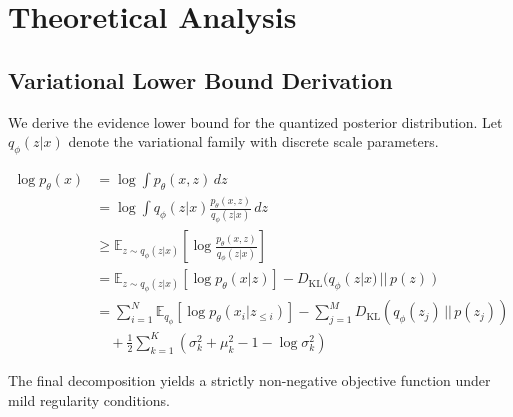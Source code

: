 \documentclass{article}
\newcommand{\E}{\mathbb{E}}
\newcommand{\KL}{D_{\text{KL}}}
\begin{document}
\section{Theoretical Analysis}
\label{sec:theory}

\subsection{Variational Lower Bound Derivation}
\label{subsec:variational_bound}
We derive the evidence lower bound for the quantized posterior distribution.
Let $q_\phi(z|x)$ denote the variational family with discrete scale parameters.

\begin{align*}
\log p_\theta(x) &= \log \int p_\theta(x, z) \, dz \\
&= \log \int q_\phi(z|x) \frac{p_\theta(x, z)}{q_\phi(z|x)} \, dz \\
&\ge \E_{z \sim q_\phi(z|x)} \left[ \log \frac{p_\theta(x, z)}{q_\phi(z|x)} \right] \\
&= \E_{z \sim q_\phi(z|x)} [\log p_\theta(x|z)] - \KL(q_\phi(z|x) \,||\, p(z)) \\
&= \sum_{i=1}^{N} \E_{q_\phi} \left[ \log p_\theta(x_i | z_{\le i}) \right] - \sum_{j=1}^{M} \KL(q_\phi(z_j) \,||\, p(z_j)) \\
&\quad + \frac{1}{2} \sum_{k=1}^{K} \left( \sigma_k^2 + \mu_k^2 - 1 - \log \sigma_k^2 \right)
\end{align*}

The final decomposition yields a strictly non-negative objective function under mild regularity conditions.
\end{document}
